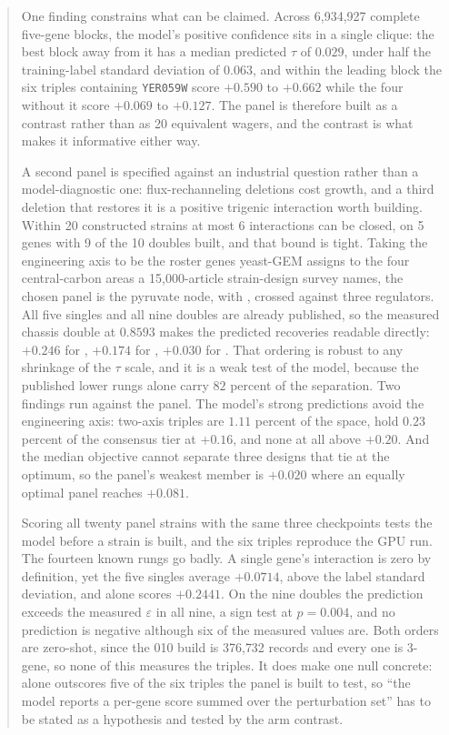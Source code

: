 \documentclass[10pt,a4paper]{article}
\theoremstyle{tcplain}
\begin{document}
\begin{abstract}
One finding constrains what can be claimed. Across 6{,}934{,}927 complete
five-gene blocks, the model's positive confidence sits in a single clique: the
best block away from it has a median predicted $\tau$ of $0.029$, under half the
training-label standard deviation of $0.063$, and within the leading block the
six triples containing \texttt{YER059W} score $+0.590$ to $+0.662$ while the four
without it score $+0.069$ to $+0.127$. The panel is therefore built as a
contrast rather than as 20 equivalent wagers, and the contrast is what makes it
informative either way.

A second panel is specified against an industrial question rather than a
model-diagnostic one: flux-rechanneling deletions cost growth, and a third
deletion that restores it is a positive trigenic interaction worth building.
Within 20 constructed strains at most 6 interactions can be closed, on 5 genes
with 9 of the 10 doubles built, and that bound is tight. Taking the engineering
axis to be the roster genes yeast-GEM assigns to the four central-carbon areas a
15{,}000-article strain-design survey names, the chosen panel is the pyruvate
node,  with , crossed against three regulators. All five
singles and all nine doubles are already published, so the measured chassis double
at $0.8593$ makes the predicted recoveries readable directly: $+0.246$ for
, $+0.174$ for , $+0.030$ for . That ordering is
robust to any shrinkage of the $\tau$ scale, and it is a weak test of the model,
because the published lower rungs alone carry $82$ percent of the separation. Two
findings run against the panel. The model's strong predictions avoid the
engineering axis: two-axis triples are $1.11$ percent of the space, hold $0.23$
percent of the consensus tier at $+0.16$, and none at all above $+0.20$. And the
median objective cannot separate three designs that tie at the optimum, so the
panel's weakest member is $+0.020$ where an equally optimal panel reaches
$+0.081$.

Scoring all twenty panel strains with the same three checkpoints tests the model
before a strain is built, and the six triples reproduce the GPU run. The fourteen
known rungs go badly. A single gene's interaction is zero by definition, yet the
five singles average $+0.0714$, above the label standard deviation, and
 alone scores $+0.2441$. On the nine doubles the prediction exceeds the
measured $\varepsilon$ in all nine, a sign test at $p = 0.004$, and no prediction
is negative although six of the measured values are. Both orders are zero-shot,
since the 010 build is 376{,}732 records and every one is 3-gene, so none of this
measures the triples. It does make one null concrete:  alone outscores
five of the six triples the panel is built to test, so ``the model reports a
per-gene score summed over the perturbation set'' has to be stated as a hypothesis
and tested by the arm contrast.


\end{abstract}
\end{document}
